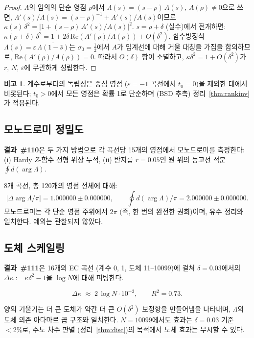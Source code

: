 \documentclass[11pt, a4paper]{article}
\theoremstyle{plain}
\theoremstyle{definition}
\newtheorem{remark}{비고}[section]
\begin{document}
\begin{proof}
  $\Lambda$의 임의의 단순 영점 $\rho$에서
  $\Lambda(s) = (s-\rho)\,A(s)$, $A(\rho)\neq 0$으로 쓰면,
  $\Lambda'(s)/\Lambda(s) = (s-\rho)^{-1} + A'(s)/A(s)$이므로
  $\kappa(s)\,\delta^{2} = |1 + (s-\rho)\,A'(s)/A(s)|^{2}$.
  $s=\rho+\delta$ (실수)에서 전개하면:
  $\kappa(\rho+\delta)\,\delta^{2} = 1 + 2\delta\,\mathrm{Re}(A'(\rho)/A(\rho))
  + O(\delta^{2})$.
  함수방정식 $\Lambda(s) = \varepsilon\,\overline{\Lambda(1-\bar{s})}$는
  $\sigma_{0}=\tfrac{1}{2}$에서 $A$가 임계선에 대해
  거울 대칭을 가짐을 함의하므로,
  $\mathrm{Re}(A'(\rho)/A(\rho))=0$.
  따라서 $O(\delta)$ 항이 소멸하고,
  $\kappa\delta^{2}=1+O(\delta^{2})$가 $r$, $N$, $\varepsilon$에 무관하게 성립한다.
\end{proof}

\begin{remark}
  계수로부터의 독립성은 중심 영점 ($\varepsilon=-1$ 곡선에서 $t_{0}=0$)을
  제외한 데에서 비롯된다;
  $t_{0}>0$에서 모든 영점은 확률 1로 단순하며 (BSD 추측)
  정리~\ref{thm:rankinv}가 적용된다.
\end{remark}


\subsection{모노드로미 정밀도}
\label{ssec:mono}

\textbf{결과~\#110}은 두 가지 방법으로 각 곡선당 15개의 영점에서
모노드로미를 측정한다: (i) Hardy $Z$-함수 선형 위상 누적,
(ii) 반지름 $r=0.05$인 원 위의 등고선 적분
$\oint d(\arg\Lambda)$.

\medskip
\noindent 8개 곡선, 총 120개의 영점 전체에 대해:
\[
  |\Delta\!\arg\Lambda / \pi| = 1.000000\pm 0.000000,
  \qquad
  \oint d(\arg\Lambda)/\pi = 2.000000\pm 0.000000.
\]
모노드로미는 각 단순 영점 주위에서 $2\pi$ (즉, 한 번의 완전한 권회)이며,
유수 정리와 일치한다. 예외는 관찰되지 않았다.


\subsection{도체 스케일링}
\label{ssec:conductor}

\textbf{결과~\#111}은 16개의 EC 곡선
(계수 0, 1, 도체 11--10099)에 걸쳐
$\delta=0.03$에서의 $\Delta\kappa := \kappa\delta^{2}-1$을
$\log N$에 대해 피팅한다.

\[
  \Delta\kappa \;\approx\; 2\,\log N \cdot 10^{-3}, \qquad R^{2}=0.73.
\]

양의 기울기는 더 큰 도체가 약간 더 큰 $O(\delta^{2})$ 보정항을 만들어냄을
나타내며, $\Lambda$의 도체 의존 아다마르 곱 구조와 일치한다.
$N=10099$에서도 효과는 $\delta=0.03$ 기준 $<2\%$로,
주도 차수 판별 (정리~\ref{thm:disc})의 목적에서
도체 효과는 무시할 수 있다.
\end{document}
